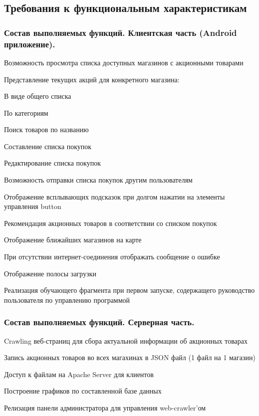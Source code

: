 \subsection{Требования к функциональным характеристикам}

\subsubsection{Состав выполняемых функций. Клиентская часть (Android приложение).}
\begin{my_enumerate}
\item Возможность просмотра списка доступных магазинов с акционными товарами
\item Представление текущих акций для конкретного магазина:
    \begin{my_enumerate}
    \item В виде общего списка
    \item По категориям
    \end{my_enumerate}
\item Поиск товаров по названию
\item Составление списка покупок
\item Редактирование списка покупок
\item Возможность отправки списка покупок другим пользователям
\item Отображение всплывающих подсказок при долгом нажатии на элементы управления button
\item Рекомендация акционных товаров в соответствии со списком покупок
\item Отображение ближайших магазинов на карте
\item При отсутствии интернет-соединения отображать сообщение о ошибке
\item Отображение полосы загрузки
\item Реализация обучающего фрагмента при первом запуске, содержащего руководство пользователя по управлению программой
\end{my_enumerate}

\subsubsection{Состав выполняемых функций. Серверная часть.}
\begin{my_enumerate}
\item Crawling веб-страниц для сбора актуальной информации об акционных товарах
\item Запись акционных товаров во всех магахинах в JSON файл (1 файл на 1 магазин)
\item Доступ к файлам на Apache Server для клиентов
\item Построение графиков по составленной базе данных
\item Релизация панели администратора для управления web-crawler'ом
\end{my_enumerate}

